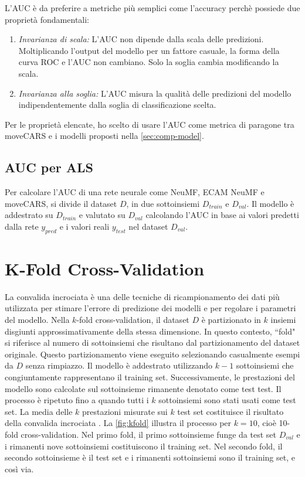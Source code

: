 \documentclass[12pt,italian]{report}
\begin{document}
L'AUC è da preferire a metriche più semplici come l'accuracy perchè possiede due proprietà fondamentali:

\begin{enumerate}
\item \textit{Invarianza di scala:} L'AUC non dipende dalla scala delle predizioni. Moltiplicando l'output del modello per un fattore casuale, la forma della curva ROC e l'AUC non cambiano. Solo la soglia cambia modificando la scala.
\item \textit{Invarianza alla soglia:} L'AUC misura la qualità delle predizioni del modello indipendentemente dalla soglia di classificazione scelta.
\end{enumerate}

Per le proprietà elencate, ho scelto di usare l'AUC come metrica di paragone tra moveCARS e i modelli proposti nella \autoref{sec:comp-model}.

\subsection{AUC per ALS}
Per calcolare l'AUC di una rete neurale come NeuMF, ECAM NeuMF e moveCARS, si divide il dataset $D$, in due sottoinsiemi $D_{train}$ e $D_{val}$. Il modello è addestrato su $D_{train}$ e valutato su $D_{val}$ calcolando l'AUC in base ai valori predetti dalla rete $y_{pred}$ e i valori reali $y_{test}$ nel dataset $D_{val}$.

\section{K-Fold Cross-Validation}
La convalida incrociata è una delle tecniche di ricampionamento dei dati più utilizzata per stimare l'errore di predizione dei modelli e  per regolare i parametri del modello. Nella $k$-fold cross-validation, il dataset $D$ è partizionato in $k$ insiemi disgiunti approssimativamente della stessa dimensione. In questo contesto, ``fold" si riferisce al numero di sottoinsiemi che risultano dal partizionamento del dataset originale. Questo partizionamento viene eseguito selezionando casualmente esempi da $D$ senza rimpiazzo. Il modello è addestrato utilizzando $k-1$ sottoinsiemi che congiuntamente rappresentano il training set. Successivamente, le prestazioni del modello sono calcolate sul sottoinsieme rimanente denotato come test test. Il processo è ripetuto fino a quando tutti i $k$ sottoinsiemi sono stati usati come test set. La media delle $k$ prestazioni misurate sui $k$ test set costituisce il risultato della convalida incrociata \cite{k-fold}. La \autoref{fig:kfold} illustra il processo per $k=10$, cioè 10-fold cross-validation. Nel primo fold, il primo sottoinsieme funge da test set $D_{val}$ e i rimanenti nove sottoinsiemi costituiscono il training set. Nel secondo fold, il secondo sottoinsieme è il test set e i rimanenti sottoinsiemi sono il training set, e così via.
\end{document}
